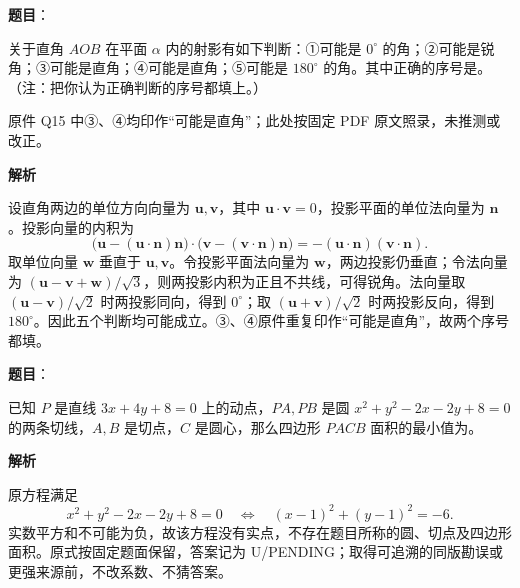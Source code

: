 \begin{answer}

\textbf{题目}：

关于直角 \(AOB\) 在平面 \(\alpha\) 内的射影有如下判断：①可能是 \(0^\circ\) 的角；②可能是锐角；③可能是直角；④可能是直角；⑤可能是 \(180^\circ\) 的角。其中正确的序号是\gkblank{}。（注：把你认为正确判断的序号都填上。）

\begin{gktip}
原件 Q15 中③、④均印作“可能是直角”；此处按固定 PDF 原文照录，未推测或改正。
\end{gktip}

\textbf{解析}

设直角两边的单位方向向量为 \(\mathbf u,\mathbf v\)，其中 \(\mathbf u\cdot\mathbf v=0\)，投影平面的单位法向量为 \(\mathbf n\)。投影向量的内积为
\nopagebreak[4]
\[
\bigl(\mathbf u-(\mathbf u\cdot\mathbf n)\mathbf n\bigr)\cdot
\bigl(\mathbf v-(\mathbf v\cdot\mathbf n)\mathbf n\bigr)
=-(\mathbf u\cdot\mathbf n)(\mathbf v\cdot\mathbf n).
\]
取单位向量 \(\mathbf w\) 垂直于 \(\mathbf u,\mathbf v\)。令投影平面法向量为 \(\mathbf w\)，两边投影仍垂直；令法向量为 \((\mathbf u-\mathbf v+\mathbf w)/\sqrt3\)，则两投影内积为正且不共线，可得锐角。法向量取 \((\mathbf u-\mathbf v)/\sqrt2\) 时两投影同向，得到 \(0^\circ\)；取 \((\mathbf u+\mathbf v)/\sqrt2\) 时两投影反向，得到 \(180^\circ\)。因此五个判断均可能成立。③、④原件重复印作“可能是直角”，故两个序号都填。


\end{answer}
\begin{answer}

\textbf{题目}：

已知 \(P\) 是直线 \(3x+4y+8=0\) 上的动点，\(PA,PB\) 是圆 \(x^2+y^2-2x-2y+8=0\) 的两条切线，\(A,B\) 是切点，\(C\) 是圆心，那么四边形 \(PACB\) 面积的最小值为\gkblank{}。

\textbf{解析}

原方程满足
\nopagebreak[4]
\[
x^2+y^2-2x-2y+8=0
\quad\Longleftrightarrow\quad
(x-1)^2+(y-1)^2=-6.
\]
实数平方和不可能为负，故该方程没有实点，不存在题目所称的圆、切点及四边形面积。原式按固定题面保留，答案记为 U/PENDING；取得可追溯的同版勘误或更强来源前，不改系数、不猜答案。


\end{answer}

